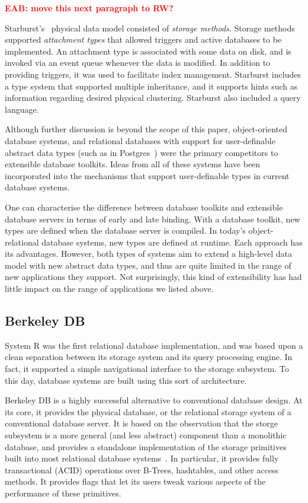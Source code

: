\documentclass[letterpaper,twocolumn,10pt]{article}
\newcommand{\eab}[1]{\textcolor{red}{\bf EAB: #1}}
\begin{document}
\eab{move this next paragraph to RW?}

Starburst's~\cite{starburst} physical data model consisted of {\em
  storage methods}.  Storage methods supported {\em attachment types}
that allowed triggers and active databases to be implemented.  An
attachment type is associated with some data on disk, and is invoked
via an event queue whenever the data is modified.  In addition to
providing triggers, it was used to facilitate index management.
Starburst includes a type system that supported multiple inheritance,
and it supports hints such as information regarding desired physical
clustering.  Starburst also included a query language.

Although further discussion is beyond the scope of this paper,
object-oriented database systems, and relational databases with
support for user-definable abstract data types (such as in
Postgres~\cite{postgres}) were the primary competitors to extensible
database toolkits.  Ideas from all of these systems have been
incorporated into the mechanisms that support user-definable types in
current database systems.

One can characterise the difference between database toolkits and
extensible database servers in terms of early and late binding.  With
a database toolkit, new types are defined when the database server is
compiled.  In today's object-relational database systems, new types
are defined at runtime.  Each approach has its advantages.  However,
both types of systems aim to extend a high-level data model with new abstract data types, and thus are quite limited in the range of new applications they support.  Not surprisingly, this kind of extensibility has had little impact on the range of applications we listed above.

\subsection{Berkeley DB}

System R was the first relational database implementation, and was
based upon a clean separation between its storage system and its
query processing engine.  In fact, it supported a simple navigational
interface to the storage subsystem.  To this day, database systems are
built using this sort of architecture.  

Berkeley DB is a highly successful alternative to conventional
database design.  At its core, it provides the physical database, or
the relational storage system of a conventional database server.
It is based on the
observation that the storge subsystem is a more general (and less
abstract) component than a monolithic database, and provides a
standalone implementation of the storage primitives built into 
most relational database systems~\cite{libtp}.  In particular, 
it provides fully transactional (ACID) operations over B-Trees, 
hashtables, and other access methods.  It provides flags that 
let its users tweak various aspects of the performance of these
primitives.
\end{document}
